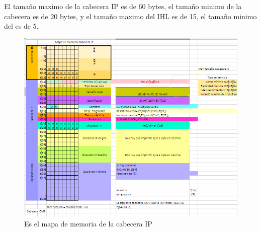 \vskip 1pt
El tama\~no maximo de la cabecera IP es de 60 bytes, el tama\~no minimo de la cabecera es de 20 bytes, y el tama\~no maximo del IHL es de 15, el tama\~no minimo del es de 5.
		\begin{figure}[h]
			\centering		
			\includegraphics[width=\textwidth]{MapaMemoria}
			\caption{Es el mapa de memoria de la cabecera IP}
		\end{figure}